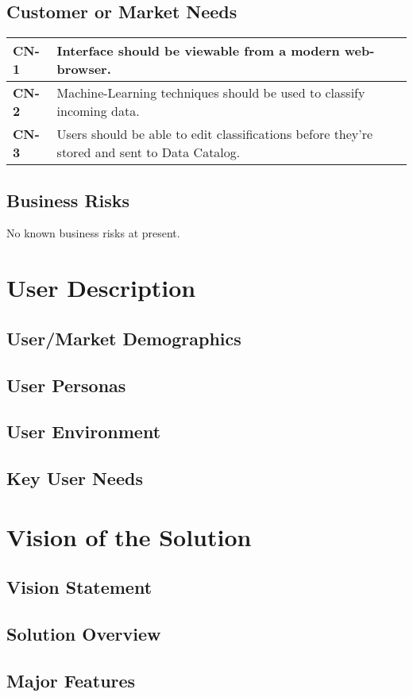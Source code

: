 \documentclass[12pt,oneside,letterpaper]{article}
\begin{document}
\subsection{Customer or Market Needs}
\begin{tabular}{|p{1in}p{4.5in}|}
\hline
\textbf{CN-1}&Interface should be viewable from a modern web-browser.\\
\hline
\textbf{CN-2}&Machine-Learning techniques should be used to classify incoming data.\\
\hline
\textbf{CN-3}&Users should be able to edit classifications before they're stored and sent to Data Catalog.\\
\hline
\end{tabular}
\subsection{Business Risks}
No known business risks at present.

\section{User Description}
\subsection{User/Market Demographics}
\subsection{User Personas}
\subsection{User Environment}
\subsection{Key User Needs}

\section{Vision of the Solution}
\subsection{Vision Statement}
\subsection{Solution Overview}
\subsection{Major Features}
\end{document}
